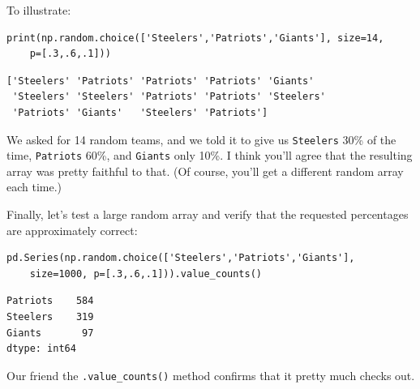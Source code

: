 To illustrate:

\begin{Verbatim}[fontsize=\footnotesize,samepage=true,frame=single,framesep=3mm]
print(np.random.choice(['Steelers','Patriots','Giants'], size=14,
    p=[.3,.6,.1]))
\end{Verbatim}
\vspace{-.2in}

\begin{Verbatim}[fontsize=\footnotesize,samepage=true,frame=leftline,framesep=5mm,framerule=1mm]
['Steelers' 'Patriots' 'Patriots' 'Patriots' 'Giants'
 'Steelers' 'Steelers' 'Patriots' 'Patriots' 'Steelers'
 'Patriots' 'Giants'   'Steelers' 'Patriots']
\end{Verbatim}

We asked for 14 random teams, and we told it to give us \texttt{Steelers} 30\%
of the time, \texttt{Patriots} 60\%, and \texttt{Giants} only 10\%. I think
you'll agree that the resulting array was pretty faithful to that. (Of course,
you'll get a different random array each time.)

Finally, let's test a large random array and verify that the requested
percentages are approximately correct:

\begin{Verbatim}[fontsize=\footnotesize,samepage=true,frame=single,framesep=3mm]
pd.Series(np.random.choice(['Steelers','Patriots','Giants'],
    size=1000, p=[.3,.6,.1])).value_counts() 
\end{Verbatim}
\vspace{-.2in}

\begin{Verbatim}[fontsize=\small,samepage=true,frame=leftline,framesep=5mm,framerule=1mm]
Patriots    584
Steelers    319
Giants       97
dtype: int64
\end{Verbatim}


Our friend the \texttt{.value\_counts()} method confirms that it pretty much
checks out.